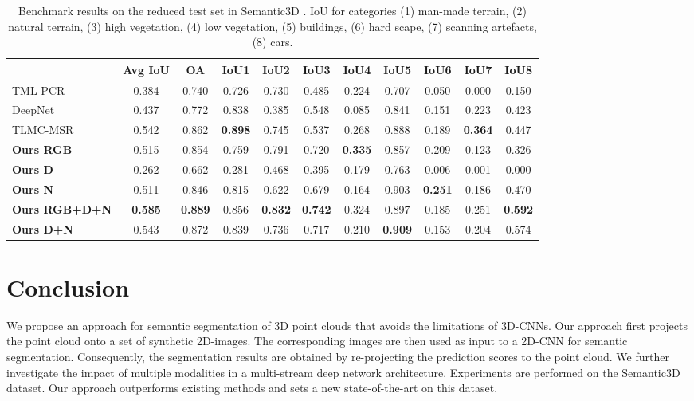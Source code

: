 \documentclass[runningheads,a4paper]{llncs}
\begin{document}
\begin{table}
	\centering
	     \caption{Benchmark results on the reduced test set in Semantic3D  \cite{hackel2017semantic3d}. IoU for categories (1) man-made terrain, (2) natural terrain, (3) high vegetation, (4)
             low vegetation, (5) buildings, (6) hard scape, (7) scanning artefacts, (8) cars.} \label{tab:reduced}     
\begin{tabular}{l@{~}c@{~~}c@{~~}c@{~~}c@{~~}c@{~~}c@{~~}c@{~~}c@{~~}c@{~~}c}  
\toprule       & {\bf Avg IoU} & {\bf OA} & {\bf IoU1} & {\bf IoU2} & {\bf IoU3} & {\bf IoU4} & {\bf IoU5} & {\bf IoU6} & {\bf IoU7} & {\bf IoU8}  \\ \midrule  
TML-PCR\cite{montoya2014mind}	& 0.384	& 0.740	& 0.726	& 0.730	& 0.485	& 0.224	& 0.707	& 0.050	& 0.000	& 0.150  \\ 
DeepNet\cite{hackel2017semantic3d} &	0.437	& 0.772	& 0.838	& 0.385	& 0.548	& 0.085	& 0.841	& 0.151	& 0.223	& 0.423 \\    
TLMC-MSR\cite{hackel2016fast} & 0.542 & 0.862	& {\bf 0.898} &	0.745 &	0.537	& 0.268 &	0.888 &	0.189 &	{\bf 0.364} &	0.447 \\\midrule   {\bf Ours RGB} & 0.515 & 0.854 & 0.759 & 0.791 & 0.720 & {\bf 0.335} & 0.857 & 0.209 & 0.123 & 0.326 \\
{\bf Ours D} & 0.262 &	0.662	& 0.281	& 0.468	& 0.395	& 0.179	& 0.763	& 0.006	& 0.001	& 0.000 \\
{\bf Ours N} & 0.511 & 0.846 & 0.815 & 0.622 & 0.679 & 0.164 &	0.903 & {\bf 0.251} & 0.186 & 0.470 \\
{\bf Ours RGB+D+N} & {\bf 0.585} & {\bf 0.889} & 0.856 &	{\bf 0.832}	& {\bf 0.742}	& 0.324	& 0.897	& 0.185	& 0.251	& {\bf 0.592} \\
         {\bf Ours D+N} & 0.543	& 0.872	& 0.839	& 0.736	& 0.717	& 0.210	& {\bf 0.909}	& 0.153	& 0.204	& 0.574 \\
         \bottomrule
     \end{tabular}
\end{table}



\section{Conclusion}

We propose an approach for semantic segmentation of 3D point clouds that avoids the limitations of 3D-CNNs. Our approach first projects the point cloud onto a set of synthetic 2D-images. The corresponding images are then used as input to a 2D-CNN for semantic segmentation. Consequently, the segmentation results are obtained by re-projecting the prediction scores to the point cloud. We further investigate the impact of multiple modalities in a multi-stream deep network architecture. Experiments are performed on the Semantic3D dataset. Our approach outperforms existing methods and sets a new state-of-the-art on this dataset.




\end{document}
